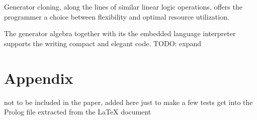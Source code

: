 \documentclass{new_tlp}
\begin{document}
Generator cloning, along the lines of similar linear logic operations, 
offers the programmer a choice between flexibility and optimal resource utilization.

The generator algebra together with its the embedded language interpreter supports
the writing compact and elegant code.
{TODO: expand}





\section*{Appendix}

{\large not to be included in the paper, added here just to make a few tests get into the Prolog file extracted from the LaTeX document}
\end{document}
